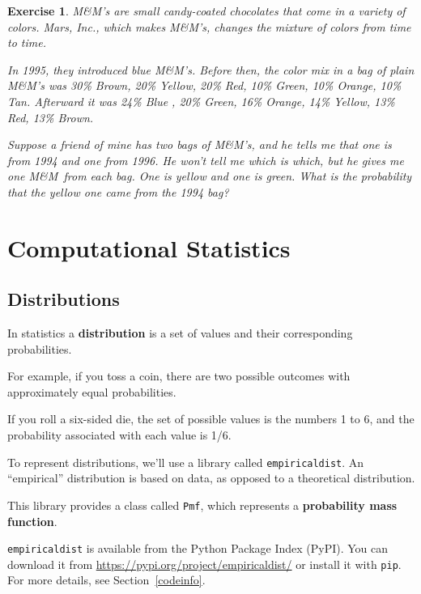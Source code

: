 \documentclass[12pt]{book}
\theoremstyle{exercise}
\newtheorem{exercise}{Exercise}[chapter]
\newcommand{\py}[1]{{\tt #1}}%
\begin{document}
\newcommand{\MM}{M\&M}

\begin{exercise}

\MM's are small candy-coated chocolates that come in a variety of
colors.  Mars, Inc., which makes \MM's, changes the mixture of
colors from time to time.

In 1995, they introduced blue \MM's.  Before then, the color mix in
a bag of plain \MM's was 30\% Brown, 20\% Yellow, 20\% Red, 10\%
Green, 10\% Orange, 10\% Tan.  Afterward it was 24\% Blue , 20\%
Green, 16\% Orange, 14\% Yellow, 13\% Red, 13\% Brown.

Suppose a friend of mine has two bags of \MM's, and he tells me
that one is from 1994 and one from 1996.  He won't tell me which is
which, but he gives me one \MM~from each bag.  One is yellow and
one is green.  What is the probability that the yellow one came
from the 1994 bag?

\end{exercise}


\chapter{Computational Statistics}
\label{compstat}

\section{Distributions}
\label{distributions}

In statistics a {\bf distribution} is a set of values and their
corresponding probabilities.

For example, if you toss a coin, there are two possible outcomes with approximately equal probabilities.

If you roll a six-sided die, the set of possible
values is the numbers 1 to 6, and the probability associated
with each value is 1/6.

To represent distributions, we'll use a library called \py{empiricaldist}.
An ``empirical'' distribution is based on data, as opposed to a theoretical distribution.

This library provides a class called \py{Pmf}, which represents
a {\bf probability mass function}.


\py{empiricaldist} is available from the Python Package Index (PyPI).
You can download it from \url{https://pypi.org/project/empiricaldist/} or install it with \py{pip}.
For more details, see Section~\ref{codeinfo}.
\end{document}
